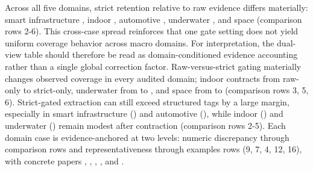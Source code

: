 {}Across all five domains, strict retention relative to raw evidence differs materially: smart infrastructure , indoor , automotive , underwater , and space  (comparison rows \markdownRendererHash{}2-\markdownRendererHash{}6). This cross-case spread reinforces that one gate setting does not yield uniform coverage behavior across macro domains. For interpretation, the dual-view table should therefore be read as domain-conditioned evidence accounting rather than a single global correction factor.\markdownRendererParagraphSeparator
{}\markdownRendererInterblockSeparator
{}\markdownRendererUlBeginTight
\markdownRendererUlItem Raw-versus-strict gating materially changes observed coverage in every audited domain; indoor contracts from  raw-only to  strict-only, underwater from  to , and space from  to  (comparison rows \markdownRendererHash{}3, \markdownRendererHash{}5, \markdownRendererHash{}6).\markdownRendererUlItemEnd 
\markdownRendererUlItem Strict-gated extraction can still exceed structured tags by a large margin, especially in smart infrastructure () and automotive (), while indoor () and underwater () remain modest after contraction (comparison rows \markdownRendererHash{}2-\markdownRendererHash{}5).\markdownRendererUlItemEnd 
\markdownRendererUlItem Each domain case is evidence-anchored at two levels: numeric discrepancy through comparison rows and representativeness through examples rows (\markdownRendererHash{}9, \markdownRendererHash{}7, \markdownRendererHash{}4, \markdownRendererHash{}12, \markdownRendererHash{}16), with concrete papers , , , , and .\markdownRendererUlItemEnd 
